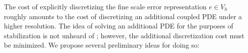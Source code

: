 \documentclass[final,leqno]{siamltex}
\newcommand{\bs}[1]{\boldsymbol{#1}}
\newcommand{\LRp}[1]{\left( #1 \right)}
\begin{document}
The cost of explicitly discretizing the fine scale error representation $e\in V_h$ roughly amounts to the cost of discretizing an additional coupled PDE under a higher resolution.   The idea of solving an additional PDE for the purposes of stabilization is not unheard of \cite{Barter}; however, the additional discretization cost must be minimized.  We propose several preliminary ideas for doing so: 
\begin{itemize}


\end{itemize}
\end{document}
